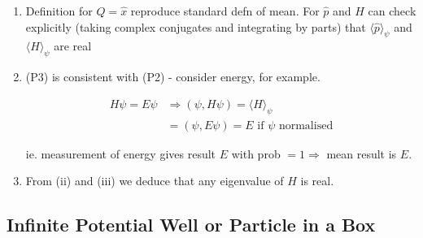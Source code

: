\documentclass[a4paper]{article}
\begin{document}
\begin{eg}
\begin{enumerate}
	\item Definition for $ Q = \hat{x} $ reproduce standard defn of mean. 
	For $ \hat{p} $ and $ H $ can check explicitly (taking complex conjugates and integrating by parts) that $ \langle \hat{p} \rangle_{\psi} $ and $ \langle H \rangle_{\psi} $ are real
	
	\item (P3) is consistent with (P2) - consider energy, for example.
	


	\begin{align*}
		H \psi = E \psi & \Rightarrow (\psi, H \psi) = \langle H \rangle_{\psi}  \\
		& = (\psi, E \psi ) = E \text{ if } \psi \text{ normalised}
	\end{align*}
	
	ie. measurement of energy gives result $ E $ with prob $ = 1  \Rightarrow $ mean result is $ E $.
	
	\item From (ii) and (iii) we deduce that any eigenvalue of $ H $ is real. 

\end{enumerate}

\end{eg}

\subsection{Infinite Potential Well or Particle in a Box }
\end{document}
